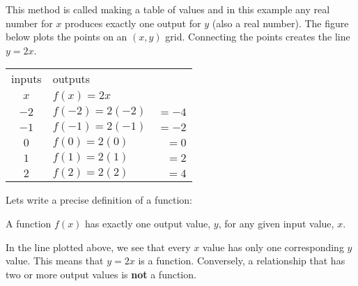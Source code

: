 This method is called making a table of values and in this example any real number for $x$ produces exactly one output for $y$ (also a real number). The figure below plots the points on an $(x,y)$ grid. Connecting the points creates the line $y=2x$.

\begin{multicols}{2}
\begin{center}
\begin{tabular}{clr}  
	\toprule
	inputs&outputs&\\
$x$&$f(x)=2x$& \\
	\midrule
	$-2$    & $f(-2)=2(-2)$&$=-4$\\
	\midrule
$-1$ & $f(-1)=2(-1)$&$=-2$ \\
\midrule
$0$ & $f(0)=2(0)$&$=0$ \\
\midrule
$1$ & $f(1)=2(1)$&$=2$ \\
\midrule
$2$ & $f(2)=2(2)$&$=4$ \\
	\bottomrule
\end{tabular}
\end{center}
\columnbreak
\begin{center}
\end{center}
\end{multicols}
\vspace{-0.5cm}
Lets write a precise definition of a function:
\begin{tcolorbox}\begin{center}
	A function $f(x)$ has exactly one output value, $y$, for any given input value, $x$.
\end{center}\end{tcolorbox}
In the line plotted above, we see that every $x$ value has only one corresponding $y$ value. This means that $y=2x$ is a function. Conversely, a relationship that has two or more output values is \textbf{not} a function. \\ 
	
